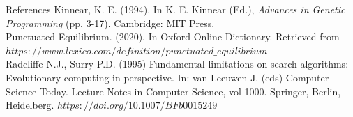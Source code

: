\documentclass[10pt,aspectratio=169]{beamer}
\begin{document}
\begin{frame}{References}
	Kinnear, K. E. (1994). In K. E. Kinnear (Ed.), \emph{Advances in
	Genetic Programming} (pp. 3-17). Cambridge: MIT Press.\\
	\medskip
	Punctuated Equilibrium. (2020). In Oxford Online Dictionary. Retrieved
	from $https://www.lexico.com/definition/punctuated\_equilibrium$\\
	\medskip
	Radcliffe N.J., Surry P.D. (1995) Fundamental limitations on search
	algorithms: Evolutionary computing in perspective.  In: van Leeuwen
	J. (eds) Computer Science Today. Lecture Notes in Computer Science,
	vol 1000. Springer, Berlin, Heidelberg.
	$https://doi.org/10.1007/BFb0015249$\\
	
\end{frame}








\end{document}
